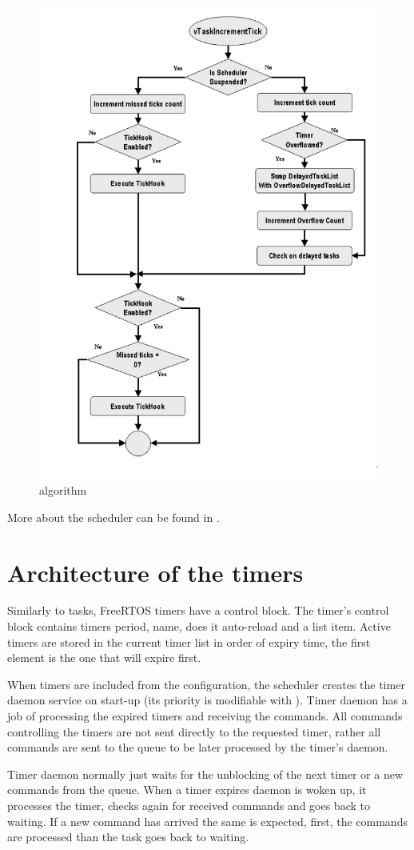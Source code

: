\begin{figure}[H]

      \centering
      \includegraphics[width=0.8\linewidth]{images/freertos_scheduler_increment.png}
      \caption{ algorithm\citep[p~31]{freertos_inner_workings}}
      \label{fig:freertos_scheduler_increment}
    
\end{figure}

More about the scheduler can be found in \citep{freertos_inner_workings}.

\section{Architecture of the timers}

Similarly to tasks, FreeRTOS timers have a control block. The timer's control block contains timers period, name, does it auto-reload and a list item. Active timers are stored in the current timer list in order of expiry time, the first element is the one that will expire first.

When timers are included from the configuration, the scheduler creates the timer daemon service on start-up (its priority is modifiable with ). Timer daemon has a job of processing the expired timers and receiving the commands. All commands controlling the timers are not sent directly to the requested timer, rather all commands are sent to the queue to be later processed by the timer's daemon.

Timer daemon normally just waits for the unblocking of the next timer or a new commands from the queue. When a timer expires daemon is woken up, it processes the timer, checks again for received commands and goes back to waiting. If a new command has arrived the same is expected, first, the commands are processed than the task goes back to waiting.

